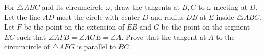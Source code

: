 For $\triangle ABC$ and its circumcircle $\omega$, draw the tangents at $B,C$ to $\omega$ meeting at $D$. Let the line $AD$ meet the circle with center $D$ and radius $DB$ at $E$ inside $\triangle ABC$. Let $F$ be the point on the extension of $EB$ and $G$ be the point on the segment $EC$ such that $\angle AFB=\angle AGE=\angle A$. Prove that the tangent at $A$ to the circumcircle of $\triangle AFG$ is parallel to $BC$.
